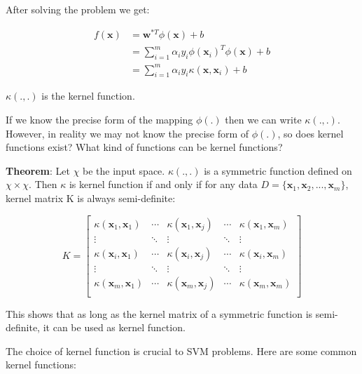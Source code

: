 \documentclass{article}
\begin{document}
After solving the problem we get:

\begin{equation}
\begin{split}
f(\boldsymbol{x}) &= \boldsymbol{w}^{*T}\phi(\boldsymbol{x}) + b \\
&= \sum_{i=1}^{m}{\alpha_i y_i \phi(\boldsymbol{x}_i)^T\phi(\boldsymbol{x})} + b \\
&= \sum_{i=1}^{m}{\alpha_i y_i \kappa(\boldsymbol{x}, \boldsymbol{x}_i)} + b
\end{split}
\end{equation}

$\kappa(.,.)$ is the kernel function.

If we know the precise form of the mapping $\phi(.)$ then we can write $\kappa(.,.)$. However, in reality we may not know the precise form of $\phi(.)$, so does kernel functions exist? What kind of functions can be kernel functions?

\textbf{Theorem}: Let $\chi$ be the input space. $\kappa(.,.)$ is a symmetric function defined on $\chi \times \chi$. Then $\kappa$ is kernel function if and only if for any data $D = \{\boldsymbol{x}_1, \boldsymbol{x}_2, ..., \boldsymbol{x}_m\}$, kernel matrix K is always semi-definite:

\begin{equation}
K = 
\begin{bmatrix}
\kappa(\boldsymbol{x}_1,\boldsymbol{x}_1) & \cdots & \kappa(\boldsymbol{x}_1,\boldsymbol{x}_j) & \cdots & \kappa(\boldsymbol{x}_1,\boldsymbol{x}_m)\\
\vdots & \ddots & \vdots & \ddots & \vdots\\
\kappa(\boldsymbol{x}_i,\boldsymbol{x}_1) & \cdots & \kappa(\boldsymbol{x}_i,\boldsymbol{x}_j) & \cdots & \kappa(\boldsymbol{x}_i,\boldsymbol{x}_m)\\
\vdots & \ddots & \vdots & \ddots & \vdots\\
\kappa(\boldsymbol{x}_m,\boldsymbol{x}_1) & \cdots & \kappa(\boldsymbol{x}_m,\boldsymbol{x}_j) & \cdots & \kappa(\boldsymbol{x}_m,\boldsymbol{x}_m)\\
\end{bmatrix}
\end{equation}

This shows that as long as the kernel matrix of a symmetric function is semi-definite, it can be used as kernel function.

The choice of kernel function is crucial to SVM problems. Here are some common kernel functions:
\end{document}
